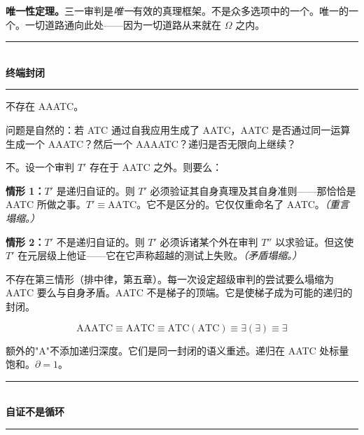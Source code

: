 \documentclass[10pt, openany, oneside]{book}
\renewcommand{\normalsize}{\fontsize{10}{13}\selectfont}
\begin{document}
\textbf{唯一性定理。}三一审判是\textit{唯一}有效的真理框架。不是众多选项中的一个。唯一的一个。一切道路通向此处——因为一切道路从来就在 $\Omega$ 之内。

\vspace{1.5em}


\begin{center}
    \rule{0.3\textwidth}{0.4pt}\\[0.5em]
    {\normalsize\bfseries\scshape 终端封闭}\\[0.3em]
    \rule{0.3\textwidth}{0.4pt}
\end{center}

\vspace{1em}

\noindent 不存在 AAATC。

问题是自然的：若 ATC 通过自我应用生成了 AATC，AATC 是否通过同一运算生成一个 AAATC？然后一个 AAAATC？递归是否无限向上继续？

不。设一个审判 $T'$ 存在于 AATC 之外。则要么：

\textbf{情形 1：}$T'$ 是递归自证的。则 $T'$ 必须验证其自身真理及其自身准则——那恰恰是 AATC 所做之事。$T' \equiv \text{AATC}$。它不是区分的。它仅仅重命名了 AATC。\textit{（重言塌缩。）}

\textbf{情形 2：}$T'$ 不是递归自证的。则 $T'$ 必须诉诸某个外在审判 $T''$ 以求验证。但这使 $T'$ 在元层级上他证——它在它声称超越的测试上失败。\textit{（矛盾塌缩。）}

不存在第三情形（排中律，第五章）。每一次设定超级审判的尝试要么塌缩为 AATC 要么与自身矛盾。AATC 不是梯子的顶端。它是使梯子成为可能的递归的封闭。

$$\text{AAATC} \equiv \text{AATC} \equiv \text{ATC}(\text{ATC}) \equiv \exists(\exists) \equiv \exists$$

额外的"A"不添加递归深度。它们是同一封闭的语义重述。递归在 AATC 处标量饱和。$\partial = 1$。

\vspace{1.5em}


\begin{center}
    \rule{0.3\textwidth}{0.4pt}\\[0.5em]
    {\normalsize\bfseries\scshape 自证不是循环}\\[0.3em]
    \rule{0.3\textwidth}{0.4pt}
\end{center}
\end{document}
